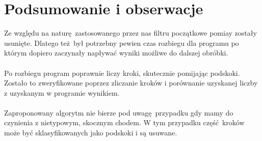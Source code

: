 \documentclass[a4paper, 12pt, titlepage]{article}
\begin{document}
    \section{Podsumowanie i obserwacje}
        Ze względu na naturę zastosowanego przez nas filtru początkowe
        pomiay zostały usunięte. Dlatego też był potrzebny pewien
        czas rozbiegu dla programu po którym dopiero zaczynały napływać
        wyniki możliwe do dalszej obróbki.
        \\ \\
        Po rozbiegu program poprawnie liczy kroki, skutecznie pomijając
        podskoki. Zostało to zweryfikowane poprzez zliczanie kroków i
        porównanie uzyskanej liczby z uzyskanym w programie wynikiem.
        \\ \\
        Zaproponowany algorytm nie bierze pod uwagę przypadku gdy mamy
        do czynienia z nietypowym, skocznym chodem. W tym przypadku
        część kroków może być sklasyfikowanych jako podskoki i są
        usuwane.
\end{document}

